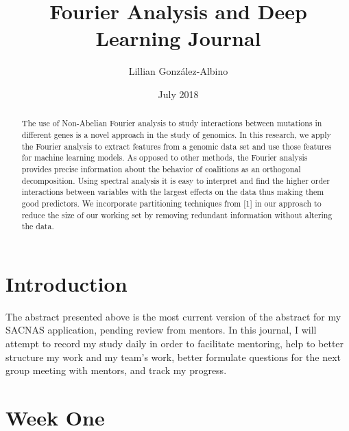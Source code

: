 \documentclass{article}
\title{Fourier Analysis and Deep Learning Journal}
\author{Lillian González-Albino}
\date{July 2018}
\begin{document}
\maketitle

\begin{abstract}
    The use of Non-Abelian Fourier analysis to study interactions between mutations in different genes is a novel approach in the study of genomics. In this research, we apply the Fourier analysis to extract features from a genomic data set and use those features for machine learning models. As opposed to other methods, the Fourier analysis provides precise information about the behavior of coalitions as an orthogonal decomposition. Using spectral analysis it is easy to interpret and find the higher order interactions between variables with the largest effects on the data thus making them good predictors. We incorporate partitioning techniques from [1]  in our approach to reduce the size of our working set by removing redundant information without altering the data.
\end{abstract}
\section{Introduction}
    The abstract presented above is the most current version of the abstract for my SACNAS application, pending review from mentors. In this journal, I will attempt to record my study daily in order to facilitate mentoring, help to better structure my work and my team's work, better formulate questions for the next group meeting with mentors, and track my progress. 

\section{Week One}
\end{document}
